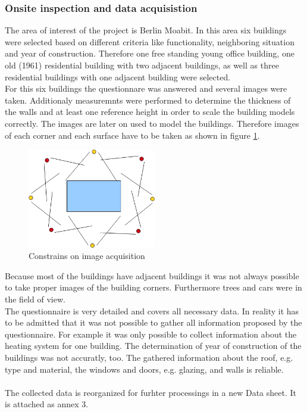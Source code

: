\subsubsection{Onsite inspection and data acquisistion}

The area of interest of the project is Berlin Moabit. In this area six buildings were selected based on different criteria like functionality, neighboring situation and year of construction. Therefore one free standing young office building, one old (1961) residential building with two adjacent buildings, as well as three residential buildings with one adjacent building were selected. \\
For this six buildings the questionnare was answered and several images were taken. Additionaly measuremnts were performed to determine the thickness of the walls and at least one reference height in order to scale the building models correctly. 
The images are later on used to model the buildings. Therefore images of each corner and each surface have to be taken as shown in figure \ref{fig:images}.

\begin{figure}[ht]
	\centering
	\includegraphics[width=0.5\textwidth]{phase1/group2/figures/images.png}
	\caption{Constrains on image acquisition}
	\label{fig:images}
\end{figure}

Because most of the buildings have adjacent buildings it was not always possible to take proper images of the building corners. Furthermore trees and cars were in the field of view.\\
The questionnaire is very detailed and covers all necessary data. In reality it has to be admitted that it was not possible to gather all information proposed by the questionnaire. For example it was only possible to collect information about the heating system for one building. The determination of year of construction of the buildings was not accuratly, too. The gathered information about the roof, e.g. type and material, the windows and doors, e.g. glazing, and walls is reliable.
\\
\\
The collected data is reorganized for furhter processings in a new Data sheet. It is attached as annex 3.


